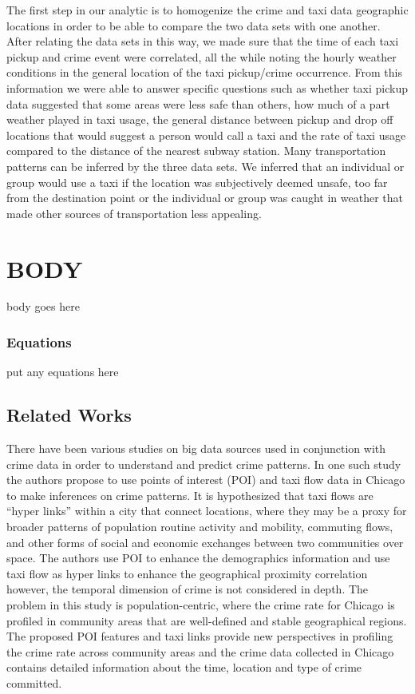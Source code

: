 \documentclass{sigkddExp}
\begin{document}
The first step in our analytic is to homogenize the crime and taxi data geographic locations in order to be able to compare the two data sets with one another. After relating the data sets in this way, we made sure that the time of each taxi pickup and crime event were correlated, all the while noting the hourly weather conditions in the general location of the taxi pickup/crime occurrence. From this information we were able to answer specific questions such as whether taxi pickup data suggested that some areas were less safe than others, how much of a part weather played in taxi usage, the general distance between pickup and drop off locations that would suggest a person would call a taxi and the rate of taxi usage compared to the distance of the nearest subway station. Many transportation patterns can be inferred by the three data sets. We inferred that an individual or group would use a taxi if the location was subjectively deemed unsafe, too far from the destination point or the individual or group was caught in weather that made other sources of transportation less appealing. 


\section{BODY}
body goes here

\subsubsection{Equations}
put any equations here

\subsection{Related Works}
There have been various studies on big data sources used in conjunction with crime data in order to understand and predict crime patterns. In one such study \cite{Wang16} the authors propose to use points of interest (POI) and taxi flow data in Chicago to make inferences on crime patterns. It is hypothesized that taxi flows are “hyper links” within a city that connect locations, where they may be a proxy for broader patterns of population routine activity and mobility, commuting flows, and other forms of social and economic exchanges between two communities over space. The authors use POI to enhance the demographics information and use taxi flow as hyper links to enhance the geographical proximity correlation however, the temporal dimension of crime is not considered in depth. The problem in this study is population-centric, where the crime rate for Chicago is profiled in community areas that are well-defined and stable geographical regions. The proposed POI features and taxi links provide new perspectives in profiling the crime rate across community areas and the crime data collected in Chicago contains detailed information about the time, location and type of crime committed.
\end{document}
